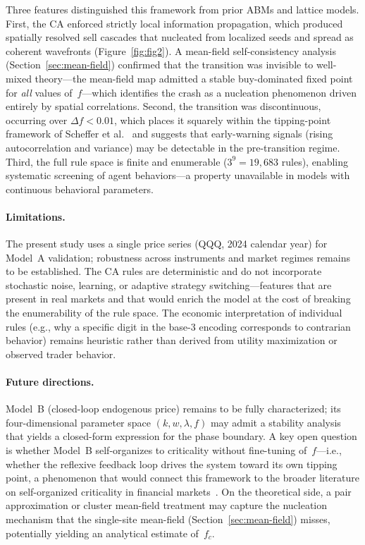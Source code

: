 \documentclass{article}
\theoremstyle{definition}
\theoremstyle{remark}
\begin{document}
Three features distinguished this framework from prior ABMs and lattice models. First,
the CA enforced strictly local information propagation, which produced spatially resolved
sell cascades that nucleated from localized seeds and spread as coherent wavefronts
(Figure~\ref{fig:fig2}). A mean-field self-consistency analysis
(Section~\ref{sec:mean-field}) confirmed that the transition was invisible to
well-mixed theory---the mean-field map admitted a stable buy-dominated fixed point for
\emph{all} values of~$f$---which identifies the crash as a nucleation phenomenon driven
entirely by spatial correlations. Second, the transition was
discontinuous, occurring over $\Delta f < 0.01$, which places it squarely within the
tipping-point framework of Scheffer et al.~\cite{scheffer2009early} and suggests that
early-warning signals (rising autocorrelation and variance) may be detectable in the
pre-transition regime. Third, the full rule space is finite and enumerable
($3^9 = 19{,}683$ rules), enabling systematic screening of agent behaviors---a property
unavailable in models with continuous behavioral parameters.

\paragraph{Limitations.}
The present study uses a single price series (QQQ, 2024 calendar year) for Model~A
validation; robustness across instruments and market regimes remains to be established.
The CA rules are deterministic and do not incorporate stochastic noise, learning, or
adaptive strategy switching---features that are present in real markets and that would
enrich the model at the cost of breaking the enumerability of the rule space. The economic
interpretation of individual rules (e.g., why a specific digit in the base-3 encoding
corresponds to contrarian behavior) remains heuristic rather than derived from utility
maximization or observed trader behavior.

\paragraph{Future directions.}
Model~B (closed-loop endogenous price) remains to be fully characterized; its
four-dimensional parameter space $(k, w, \lambda, f)$ may admit a stability analysis
that yields a closed-form expression for the phase boundary. A key open question is
whether Model~B self-organizes to criticality without fine-tuning of~$f$---i.e., whether
the reflexive feedback loop drives the system toward its own tipping point, a phenomenon
that would connect this framework to the broader literature on self-organized criticality
in financial markets~\cite{sornette2017why,bak1987selforganized,gabaix2003theory}. On
the theoretical side, a pair approximation or cluster mean-field treatment may capture
the nucleation mechanism that the single-site mean-field
(Section~\ref{sec:mean-field}) misses, potentially yielding an analytical estimate
of~$f_c$.
\end{document}

